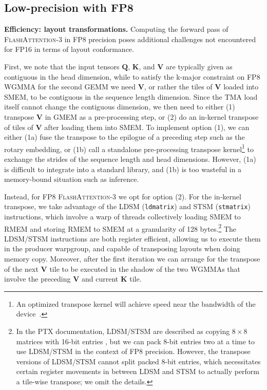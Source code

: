 \subsection{Low-precision with FP8}
\label{sec:algofp8}

\textbf{Efficiency: layout transformations.} Computing the forward pass of \textsc{FlashAttention-3} in FP8 precision poses additional challenges not encountered for FP16 in terms of layout conformance.

First, we note that the input tensors $\mathbf{Q}$, $\mathbf{K}$, and $\mathbf{V}$
are typically given as contiguous in the head dimension, while to satisfy the k-major constraint on FP8 WGMMA for the second GEMM we need $\mathbf{V}$,
or rather the tiles of $\mathbf{V}$ loaded into SMEM, to be contiguous in the sequence length dimension. Since the TMA load itself cannot change the contiguous dimension, we then need to either (1) transpose $\mathbf{V}$ in GMEM as a pre-processing step, or (2) do an in-kernel transpose of tiles of $\mathbf{V}$ after loading them into SMEM. To implement option (1), we can either (1a) fuse the transpose to the epilogue of a preceding step such as the rotary embedding, or (1b) call a standalone pre-processing transpose
kernel\footnote{An optimized transpose kernel will achieve speed near the bandwidth of the device~\citep{colfax_cutlass_transpose_2024}.} to exchange the strides of the sequence length and head dimensions. However, (1a) is difficult to integrate into a standard library, and (1b) is too wasteful in a memory-bound situation such as inference.

Instead, for FP8 \textsc{FlashAttention-3} we opt for option (2). For the in-kernel transpose, we take advantage of the LDSM (\verb|ldmatrix|)
and STSM (\verb|stmatrix|) instructions, which involve a warp of threads collectively loading SMEM to RMEM and storing RMEM to SMEM at a granularity of 128 bytes.\footnote{In the PTX documentation, LDSM/STSM are described as copying $8 \times 8$ matrices with 16-bit entries \cite[\S 9.7.13.4.15-16]{ptx}, but we can pack 8-bit entries two at a time to use LDSM/STSM in the context of FP8 precision. However, the transpose versions of LDSM/STSM cannot split packed 8-bit entries, which necessitates certain register movements in between LDSM and STSM to actually perform a tile-wise transpose; we omit the details.} The LDSM/STSM instructions are both register efficient, allowing us to execute them in the producer warpgroup, and capable of transposing layouts when doing memory copy. Moreover, after the first iteration we can arrange for the transpose of the next $\mathbf{V}$ tile to be executed in the shadow of the two WGMMAs that involve the preceding $\mathbf{V}$ and current $\mathbf{K}$ tile.

